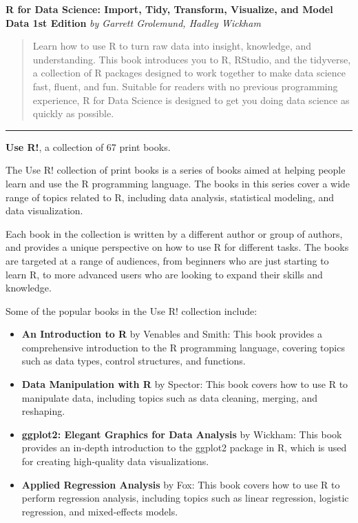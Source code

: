 \documentclass[
]{book}
\providecommand{\tightlist}{%
  \setlength{\itemsep}{0pt}\setlength{\parskip}{0pt}}
\begin{document}
\textbf{R for Data Science: Import, Tidy, Transform, Visualize, and Model Data 1st Edition} \emph{by Garrett Grolemund, Hadley Wickham}

\begin{quote}
Learn how to use R to turn raw data into insight, knowledge, and understanding.
This book introduces you to R, RStudio, and the tidyverse, a collection of R
packages designed to work together to make data science fast, fluent, and fun.
Suitable for readers with no previous programming experience, R for Data
Science is designed to get you doing data science as quickly as possible.
\end{quote}

\begin{center}\rule{0.5\linewidth}{0.5pt}\end{center}

\textbf{Use R!}, a collection of 67 print books.

The Use R! collection of print books is a series of books aimed at helping people learn and use the R programming language. The books in this series cover a wide range of topics related to R, including data analysis, statistical modeling, and data visualization.

Each book in the collection is written by a different author or group of authors, and provides a unique perspective on how to use R for different tasks. The books are targeted at a range of audiences, from beginners who are just starting to learn R, to more advanced users who are looking to expand their skills and knowledge.

Some of the popular books in the Use R! collection include:

\begin{itemize}
\tightlist
\item
  \textbf{An Introduction to R} by Venables and Smith: This book provides a comprehensive introduction to the R programming language, covering topics such as data types, control structures, and functions.
\item
  \textbf{Data Manipulation with R} by Spector: This book covers how to use R to manipulate data, including topics such as data cleaning, merging, and reshaping.
\item
  \textbf{ggplot2: Elegant Graphics for Data Analysis} by Wickham: This book provides an in-depth introduction to the ggplot2 package in R, which is used for creating high-quality data visualizations.
\item
  \textbf{Applied Regression Analysis} by Fox: This book covers how to use R to perform regression analysis, including topics such as linear regression, logistic regression, and mixed-effects models.
\end{itemize}
\end{document}
